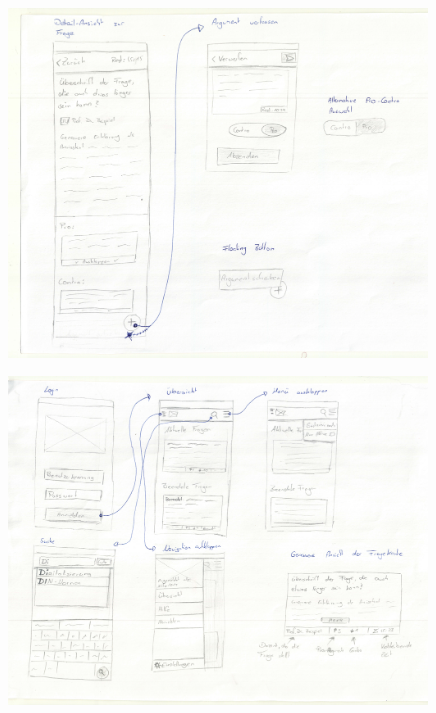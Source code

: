 \clearpage
\begin{figure}
  \vspace{-20pt}
  \begin{center}
    \includegraphics[width=0.99\textwidth]{./images/entwuerfe/toby3}
  \end{center}
  \vspace{-40pt}
\end{figure}


\clearpage
\begin{figure}
  \vspace{-20pt}
  \begin{center}
    \includegraphics[width=0.99\textwidth]{./images/entwuerfe/toby4}
  \end{center}
  \vspace{-40pt}
\end{figure}
